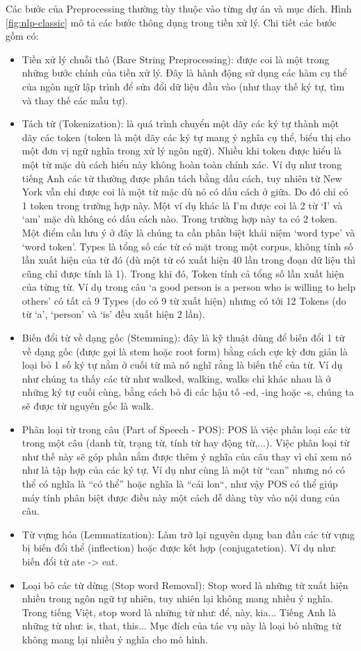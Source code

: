 Các bước của Preprocessing thường tùy thuộc vào từng dự án và mục đích. Hình \ref{fig:nlp-classic} mô tả các bước thông dụng trong tiền xử lý. Chi tiết các bước gồm có:
\begin{itemize}
    \item Tiền xử lý chuỗi thô (Bare String Preprocessing): được coi là một trong những bước chính của tiền xử lý. Đây là hành động sử dụng các hàm cụ thể của ngôn ngữ lập trình để sửa đổi dữ liệu đầu vào (như thay thế ký tự, tìm và thay thế các mẫu tự).
    \item Tách từ (Tokenization): là quá trình chuyển một dãy các ký tự thành một dãy các token (token là một dãy các ký tự mang ý nghĩa cụ thể, biểu thị cho một đơn vị ngữ nghĩa trong xử lý ngôn ngữ). Nhiều khi token được hiểu là một từ mặc dù cách hiểu này không hoàn toàn chính xác. Ví dụ như trong tiếng Anh các từ thường được phân tách bằng dấu cách, tuy nhiên từ New York vẫn chỉ được coi là một từ mặc dù nó có dấu cách ở giữa. Do đó chỉ có 1 token trong trường hợp này. Một ví dụ khác là I’m được coi là 2 từ ‘I’ và ‘am’ mặc dù không có dấu cách nào. Trong trường hợp này ta có 2 token. Một điểm cần lưu ý ở đây là chúng ta cần phân biệt khái niệm ‘word type’ và ‘word token’. Types là tổng số các từ có mặt trong một corpus, không tính số lần xuất hiện của từ đó (dù một từ có xuất hiện 40 lần trong đoạn dữ liệu thì cũng chỉ được tính là 1). Trong khi đó, Token tính cả tổng số lần xuất hiện của từng từ. Ví dụ trong câu ‘a good person is a person who is willing to help others’ có tất cả 9 Types (do có 9 từ xuất hiện) nhưng có tới 12 Tokens (do từ ‘a’, ‘person’ và ‘is’ đều xuất hiện 2 lần).
    \item Biến đổi từ về dạng gốc (Stemming): đây là kỹ thuật dùng để biến đổi 1 từ về dạng gốc (được gọi là stem hoặc root form) bằng cách cực kỳ đơn giản là loại bỏ 1 số ký tự nằm ở cuối từ mà nó nghĩ rằng là biến thể của từ. Ví dụ như chúng ta thấy các từ như walked, walking, walks chỉ khác nhau là ở những ký tự cuối cùng, bằng cách bỏ đi các hậu tố -ed, -ing hoặc -s, chúng ta sẽ được từ nguyên gốc là walk.
    \item Phân loại từ trong câu (Part of Speech - POS): POS là việc phân loại các từ trong một câu (danh từ, trạng từ, tính từ hay động từ,...). Việc phân loại từ như thế này sẽ góp phần nắm được thêm ý nghĩa của câu thay vì chỉ xem nó như là tập hợp của các ký tự. Ví dụ như cùng là một từ “can” nhưng nó có thể có nghĩa là “có thể” hoặc nghĩa là “cái lon“, như vậy POS có thể giúp máy tính phân biệt được điều này một cách dễ dàng tùy vào nội dung của câu.
    \item Từ vựng hóa (Lemmatization): Làm trở lại nguyên dạng ban đầu các từ vựng bị biến đổi thể (inflection) hoặc được kết hợp (conjugatetion). Ví dụ như: biến đổi từ ate -> eat.
    \item Loại bỏ các từ dừng (Stop word Removal): Stop word là những từ xuất hiện nhiều trong ngôn ngữ tự nhiên, tuy nhiên lại không mang nhiều ý nghĩa. Trong tiếng Việt, stop word là những từ như: để, này, kia... Tiếng Anh là những từ như: is, that, this... Mục đích của tác vụ này là loại bỏ những từ không mang lại nhiều ý nghĩa cho mô hình.
\end{itemize}

